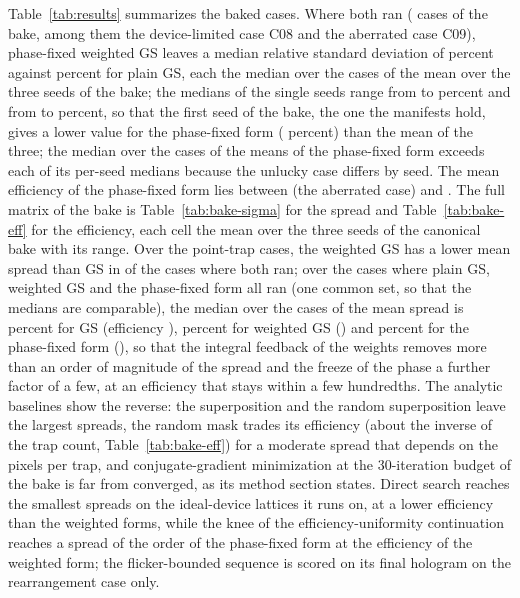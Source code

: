 Table~\ref{tab:results} summarizes the baked cases. Where both ran (\hlN{} cases of the bake, among them the device-limited case C08 and the aberrated case C09), phase-fixed weighted GS leaves a median relative standard deviation of \hlSigmaMseven{} percent against \hlSigmaMfour{} percent for plain GS, each the median over the cases of the mean over the three seeds of the bake; the medians of the single seeds range from \hlSigmaMsevenLo{} to \hlSigmaMsevenHi{} percent and from \hlSigmaMfourLo{} to \hlSigmaMfourHi{} percent, so that the first seed of the bake, the one the manifests hold, gives a lower value for the phase-fixed form (\medSigmaMseven{} percent) than the mean of the three; the median over the cases of the means of the phase-fixed form exceeds each of its per-seed medians because the unlucky case differs by seed. The mean efficiency of the phase-fixed form lies between \hlEffLo{} (the aberrated case) and \hlEffHi{}. The full matrix of the bake is Table~\ref{tab:bake-sigma} for the spread and Table~\ref{tab:bake-eff} for the efficiency, each cell the mean over the three seeds of the canonical bake with its range. Over the \nTrapCases{} point-trap cases, the weighted GS has a lower mean spread than GS in \winsSixOverFour{} of the \nBothFourSix{} cases where both ran; over the \cmN{} cases where plain GS, weighted GS and the phase-fixed form all ran (one common set, so that the medians are comparable), the median over the cases of the mean spread is \cmSigmaFour{} percent for GS (efficiency \cmEffFour), \cmSigmaSix{} percent for weighted GS (\cmEffSix) and \cmSigmaSeven{} percent for the phase-fixed form (\cmEffSeven), so that the integral feedback of the weights removes more than an order of magnitude of the spread and the freeze of the phase a further factor of a few, at an efficiency that stays within a few hundredths. The analytic baselines show the reverse: the superposition and the random superposition leave the largest spreads, the random mask trades its efficiency (about the inverse of the trap count, Table~\ref{tab:bake-eff}) for a moderate spread that depends on the pixels per trap, and conjugate-gradient minimization at the 30-iteration budget of the bake is far from converged, as its method section states. Direct search reaches the smallest spreads on the ideal-device lattices it runs on, at a lower efficiency than the weighted forms, while the knee of the efficiency-uniformity continuation reaches a spread of the order of the phase-fixed form at the efficiency of the weighted form; the flicker-bounded sequence is scored on its final hologram on the rearrangement case only.

